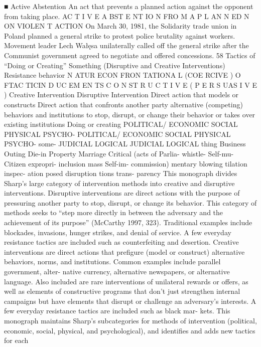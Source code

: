 \documentclass[twoside,a4paper,12pt,fleqn,openany]{extbook}
\begin{document}
■ Active Abstention
An act that prevents a planned action against the opponent from taking place.
AC T I V E A BST E NT IO N FRO M A P L AN N ED N ON VIOLEN T ACTION
On March 30, 1981, the Solidarity trade union in Poland planned a general strike to protest
police brutality against workers. Movement leader Lech Wałęsa unilaterally called off the
general strike after the Communist government agreed to negotiate and offered
concessions.
58
Tactics of “Doing or Creating” Something (Disruptive and Creative Interventions)
Resistance
behavior
N ATUR ECON FRON TATIONA L
(COE RCIVE )
O FTAC TICIN D UC EM EN TS
C O N ST R U C T I V E
( P E R S UAS I V E )
Creative Intervention
Disruptive Intervention
Direct action that models or constructs
Direct action that confronts another party
alternative (competing) behaviors and institutions
to stop, disrupt, or change their behavior
or takes over existing institutions
Doing or
creating
POLITICAL/
 ECONOMIC
 SOCIAL
 PHYSICAL
 PSYCHO-
 POLITICAL/
 ECONOMIC
 SOCIAL
 PHYSICAL
 PSYCHO-
some-
 JUDICIAL
 LOGICAL
 JUDICIAL
 LOGICAL
thing
 Business
 Outing
 Die-in
 Property
 Marriage
 Critical
(acts of
 Parlia-
 whistle-
 Self-mu-
 Citizen
 expropri-
 inclusion
 mass
 Self-im-
commission)
 mentary
 blowing
 tilation
 inspec-
 ation
 posed
disruption
 tions
 trans-
parency
This monograph divides Sharp’s large category of intervention methods into creative and
disruptive interventions. Disruptive interventions are direct actions with the purpose of
pressuring another party to stop, disrupt, or change its behavior. This category of methods
seeks to “step more directly in between the adversary and the achievement of its purpose”
(McCarthy 1997, 323). Traditional examples include blockades, invasions, hunger strikes,
and denial of service. A few everyday resistance tactics are included such as counterfeiting
and desertion.
Creative interventions are direct actions that prefigure (model or construct) alternative
behaviors, norms, and institutions. Common examples include parallel government, alter-
native currency, alternative newspapers, or alternative language. Also included are rare
interventions of unilateral rewards or offers, as well as elements of constructive programs
that don’t just strengthen internal campaigns but have elements that disrupt or challenge
an adversary’s interests. A few everyday resistance tactics are included such as black mar-
kets. This monograph maintains Sharp’s subcategories for methods of intervention (political,
economic, social, physical, and psychological), and identifies and adds new tactics for each
\end{document}
